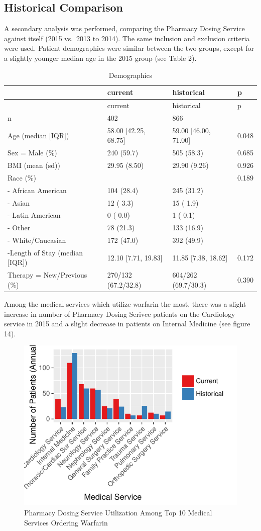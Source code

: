 \documentclass[]{article}
\begin{document}
\subsection{Historical Comparison}\label{historical-comparison}

A secondary analysis was performed, comparing the Pharmacy Dosing
Service against itself (2015 vs.~2013 to 2014). The same inclusion and
exclusion criteria were used. Patient demographics were similar between
the two groups, except for a slightly younger median age in the 2015
group (see Table 2).

\begin{longtable}[]{@{}llll@{}}
\caption{Demographics}\tabularnewline
\toprule
& current & historical & p\tabularnewline
\midrule
\endfirsthead
\toprule
& current & historical & p\tabularnewline
\midrule
\endhead
n & 402 & 866 &\tabularnewline
Age (median {[}IQR{]}) & 58.00 {[}42.25, 68.75{]} & 59.00 {[}46.00,
71.00{]} & 0.048\tabularnewline
Sex = Male (\%) & 240 (59.7) & 505 (58.3) & 0.685\tabularnewline
BMI (mean (sd)) & 29.95 (8.50) & 29.90 (9.26) & 0.926\tabularnewline
Race (\%) & & & 0.189\tabularnewline
- African American & 104 (28.4) & 245 (31.2) &\tabularnewline
- Asian & 12 ( 3.3) & 15 ( 1.9) &\tabularnewline
- Latin American & 0 ( 0.0) & 1 ( 0.1) &\tabularnewline
- Other & 78 (21.3) & 133 (16.9) &\tabularnewline
- White/Caucasian & 172 (47.0) & 392 (49.9) &\tabularnewline
-Length of Stay (median {[}IQR{]}) & 12.10 {[}7.71, 19.83{]} & 11.85
{[}7.38, 18.62{]} & 0.172\tabularnewline
Therapy = New/Previous (\%) & 270/132 (67.2/32.8) & 604/262 (69.7/30.3)
& 0.390\tabularnewline
\bottomrule
\end{longtable}

Among the medical services which utilize warfarin the most, there was a
slight increase in number of Pharmacy Dosing Serivce patients on the
Cardiology service in 2015 and a slight decrease in patients on Internal
Medicine (see figure 14).

\begin{figure}[H]
\centering
\includegraphics{warfarin_analysis_2015_files/figure-latex/ds_med_service-1.pdf}
\caption{Pharmacy Dosing Service Utilization Among Top 10 Medical
Services Ordering Warfarin}
\end{figure}
\end{document}
